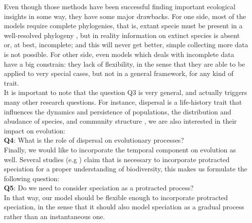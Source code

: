 
Even though those methods have been successful finding important ecological insights in some way, they have some major drawbacks. For one side, most of the models require complete phylogenies, that is, extant specie must be present in a well-resolved phylogeny \cite{fitzjohn2009estimating}, but in reality information on extinct species is absent or, at best, incomplete; and this will never get better, simple collecting more data is not possible. For other side, even models which deals with incomplete data have a big constrain: they lack of flexibility, in the sense that they are able to be applied to very special cases, but not in a general framework, for any kind of trait. \\

It is important to note that the question Q3 is very general, and actually triggers many other research questions. For instance, dispersal is a life-history trait that influences the dynamics and persistence of populations, the distribution and abudance of species, and community structure \cite{silwood1999evolutionary}, we are also interested in their impact on evolution:\\

{\bf Q4}: What is the role of dispersal on evolutionary processes?\\



 


Finally, we would like to incorporate the temporal component on evolution as well. Several studies (e.g  \cite{rosindell2010protracted}) claim that is necessary to incorporate protracted speciation for a proper understanding of biodiversity, this makes us formulate the following question:\\


{\bf Q5}: Do we need to consider speciation as a protracted process? \\


In that way, our model should be flexible enough to incorporate protracted speciation, in the sense that it should also model speciation as a gradual process rather than an instantaneous one. \\

